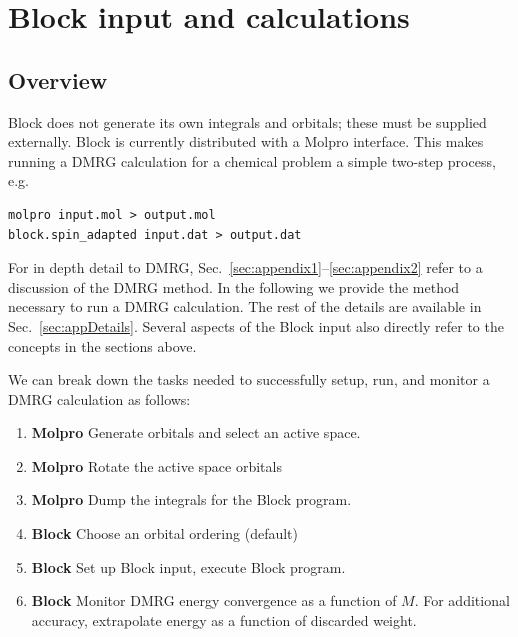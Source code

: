 \documentclass[letterpaper,12pt,aps, pra]{revtex4-1}
\begin{document}
\section{Block input and calculations}

\subsection{Overview}

Block does not generate its own integrals and orbitals; these must be supplied externally. Block
is currently distributed  with a Molpro interface. This makes running a DMRG calculation for a chemical problem a simple two-step process, e.g.
\begin{verbatim}
molpro input.mol > output.mol
block.spin_adapted input.dat > output.dat
\end{verbatim}

For in depth detail to DMRG, Sec.~\ref{sec:appendix1}--\ref{sec:appendix2}
refer to a discussion of the DMRG method.  In the following we provide the
method necessary to run a DMRG calculation.  The rest of the details are
available in Sec.~\ref{sec:appDetails}.  Several aspects of the Block input
also directly refer to the concepts in the sections above.

We can break down the tasks needed to successfully setup, run, and monitor a DMRG calculation as follows:
\begin{enumerate}
\item {\bf Molpro} Generate orbitals and select an active space. 
\item {\bf Molpro} Rotate the active space orbitals
\item {\bf Molpro} Dump the integrals for the Block program.
\item {\bf Block} Choose an orbital ordering (default)
\item {\bf Block} Set up Block input, execute Block program.
\item {\bf Block} Monitor DMRG energy convergence as a function of $M$. For additional accuracy, extrapolate energy as a function of discarded weight. 
\end{enumerate}

\end{document}
